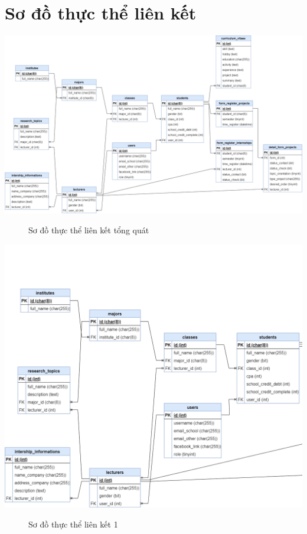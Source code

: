 \section{Sơ đồ thực thể liên kết}

    \begin{center}
      \includegraphics[width=1.1\textwidth]{../drawio/db_sv11.png}
      \begin{figure}[h]
        \centering
        \caption{Sơ đồ thực thể liên kết tổng quát}
      \end{figure}
    \end{center}
    \begin{center}
      \includegraphics[width=1.1\textwidth]{../drawio/db_sv22.png}
      \begin{figure}[h]
        \centering
        \caption{Sơ đồ thực thể liên kết 1}
      \end{figure}
    \end{center}
